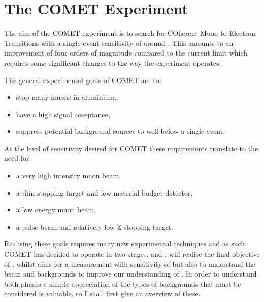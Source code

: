 

\chapter{The COMET Experiment}

The aim of the COMET experiment is to search for COherent Muon to Electron Transitions with a single-event-sensitivity of around \sensePII.
This amounts to an improvement of four orders of magnitude compared to the current limit \cite{sindrum2006} which requires some significant changes to the way the experiment operates.

The general experimental goals of COMET are to:
\begin{itemize}
\item stop many muons in aluminium,
\item have a high signal acceptance,
\item suppress potential background sources to well below a single event.
\end{itemize}

At the level of sensitivity desired for COMET these requirements translate to the need for:
\begin{itemize}
\item a very high intensity muon beam,
\item a thin stopping target and low material budget detector,
\item a low energy muon beam,
\item a pulse beam and relatively low-Z stopping target.
\end{itemize}

Realising these goals requires many new experimental techniques and as such COMET has decided to operate in two stages, \phaseI and \phaseII.
\phaseII will realise the final objective of \sensePII, whilst \phaseI aims for a measurement with sensitivity of \sensePI but also to understand the beam and backgrounds to improve our understanding of \phaseII.
In order to understand both phases a simple appreciation of the types of backgrounds that must be considered is valuable, so I shall first give an overview of these.

